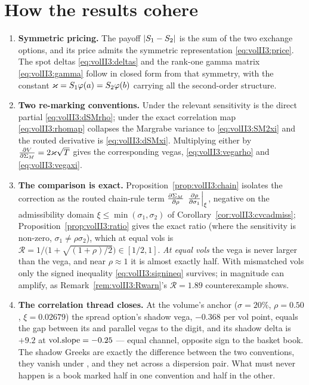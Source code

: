\section{How the results cohere}
\label{sec:volII3:cohere}

\begin{enumerate}[label=(\arabic*)]
\item \textbf{Symmetric pricing.} The payoff $\lvert S_1 - S_2\rvert$ is the sum of
the two exchange options, and its price admits the symmetric representation
\eqref{eq:volII3:price}. The spot deltas \eqref{eq:volII3:deltas} and the
rank-one gamma matrix \eqref{eq:volII3:gamma} follow in closed form from that
symmetry, with the constant $\varkappa = S_1\varphi(a) = S_2\varphi(b)$ carrying all
the second-order structure.

\item \textbf{Two re-marking conventions.} Under \stickyrho{} the relevant
sensitivity is the direct partial \eqref{eq:volII3:dSMrho}; under \stickycvc{}
the exact correlation map \eqref{eq:volII3:rhomap} collapses the Margrabe
variance to \eqref{eq:volII3:SM2xi} and the routed derivative is
\eqref{eq:volII3:dSMxi}. Multiplying either by $\frac{\partial V}{\partial \Sigma_M} =
2\varkappa\sqrt{T}$ gives the corresponding vegas, \eqref{eq:volII3:vegarho} and
\eqref{eq:volII3:vegaxi}.

\item \textbf{The comparison is exact.}
Proposition~\ref{prop:volII3:chain} isolates the \stickycvc{} correction as
the routed chain-rule term
$\frac{\partial \Sigma_M}{\partial \rho}\,\left.\frac{\partial \rho}{\partial \sigma_1}\right|_{\xi}$, negative on the
admissibility domain $\xi \le \min(\sigma_1, \sigma_2)$ of
Corollary~\ref{cor:volII3:cvcadmiss}; Proposition~\ref{prop:volII3:ratio}
gives the exact ratio (where the \stickyrho{} sensitivity is non-zero,
$\sigma_1 \ne \rho\sigma_2$), which at equal vols is
$\mathcal{R} = 1\big/\bigl(1 + \sqrt{(1+\rho)/2}\bigr) \in [1/2, 1]$. \emph{At
equal vols} the \stickycvc{} vega is never larger than the \stickyrho{} vega,
and near $\rho \approx 1$ it is almost exactly half. With mismatched vols only
the signed inequality \eqref{eq:volII3:signineq} survives; in magnitude
\stickycvc{} can amplify, as Remark~\ref{rem:volII3:Rwarn}'s $\mathcal{R} =
1.89$ counterexample shows.

\item \textbf{The correlation thread closes.} At the volume's anchor
($\sigma = 20\%$, $\rho = 0.50$, $\xi = 0.02679$) the spread option's shadow
vega, $-0.368$ per vol point, equals the gap between its \stickycvc{} and
\stickyrho{} parallel vegas to the digit, and its shadow delta is $+9.2$ at
$\mathrm{vol.slope} = -0.25$ --- equal channel, opposite sign to the basket book. The
shadow Greeks are exactly the difference between the two conventions, they
vanish under \stickyrho{}, and they net across a dispersion pair. What must
never happen is a book marked half in one convention and half in the other.
\end{enumerate}
